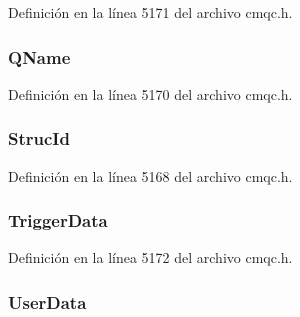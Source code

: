 Definición en la línea 5171 del archivo cmqc.\+h.

\hypertarget{structtag_m_q_t_m_adb95258c4248dc60e3647d2abab48a52}{}
\subsubsection[{Q\+Name}]{ Q\+Name}\label{structtag_m_q_t_m_adb95258c4248dc60e3647d2abab48a52}


Definición en la línea 5170 del archivo cmqc.\+h.

\hypertarget{structtag_m_q_t_m_a0530922ca944569b52601d74941f96e4}{}
\subsubsection[{Struc\+Id}]{ Struc\+Id}\label{structtag_m_q_t_m_a0530922ca944569b52601d74941f96e4}


Definición en la línea 5168 del archivo cmqc.\+h.

\hypertarget{structtag_m_q_t_m_a172805e57851aa511b91533dd357ab99}{}
\subsubsection[{Trigger\+Data}]{ Trigger\+Data}\label{structtag_m_q_t_m_a172805e57851aa511b91533dd357ab99}


Definición en la línea 5172 del archivo cmqc.\+h.

\hypertarget{structtag_m_q_t_m_a1a68f57af575a62cedaa18c391695747}{}
\subsubsection[{User\+Data}]{ User\+Data}\label{structtag_m_q_t_m_a1a68f57af575a62cedaa18c391695747}


